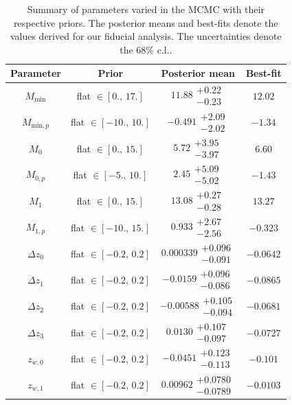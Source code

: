 \documentclass[a4paper,11pt]{article}
\newcommand\Tstrut{\rule{0pt}{3ex}}
\begin{document}
    \begin{table}
      \caption{Summary of parameters varied in the MCMC with their respective priors. The posterior means and best-fits denote the values derived for our fiducial analysis. The uncertainties denote the $68 \%$ c.l..} \label{tab:params}
      \begin{center}
        \begin{tabular}{cccc}
          \hline\hline 
          Parameter & Prior & Posterior mean & Best-fit \\ \hline \Tstrut                             
          $M_{\mathrm{min}}$ & flat $\in [0., \,17.]$ & $11.88\substack{+0.22 \\ -0.23}$ & $12.02$ \\ 
          $M_{\mathrm{min}, p}$ & flat $\in [-10., \,10.]$ & $-0.491\substack{+2.09 \\ -2.02}$ & $-1.34$ \\
          $M_{0}$ & flat $\in [0., \,15.]$ & $5.72\substack{+3.95 \\ -3.97}$ & $6.60$ \\
          $M_{0, p}$ & flat $\in [-5., \,10.]$ & $2.45\substack{+5.09 \\ -5.02}$ & $-1.43$ \\
          $M_{1}$ & flat $\in [0., \,15.]$ & $13.08\substack{+0.27 \\ -0.28}$ & $13.27$ \\ 
          $M_{1, p}$ & flat $\in [-10., \,15.]$ & $0.933\substack{+2.67 \\ -2.56}$ & $-0.323$ \\
          $\Delta z_{0}$ & flat $\in [-0.2, \,0.2]$ & $0.000339\substack{+0.096 \\ -0.091}$ & $-0.0642$ \\
          $\Delta z_{1}$ & flat $\in [-0.2, \,0.2]$ & $-0.0159\substack{+0.096 \\ -0.086}$ & $-0.0865$ \\
          $\Delta z_{2}$ & flat $\in [-0.2, \,0.2]$ & $-0.00588\substack{+0.105 \\ -0.094}$ & $-0.0681$ \\
          $\Delta z_{3}$ & flat $\in [-0.2, \,0.2]$ & $0.0130\substack{+0.107 \\ -0.097}$ & $-0.0727$ \\
          $z_{w, 0}$ & flat $\in [-0.2, \,0.2]$ & $-0.0451\substack{+0.123 \\ -0.113}$ & $-0.101$ \\
          $z_{w, 1}$ & flat $\in [-0.2, \,0.2]$ & $0.00962\substack{+0.0780 \\ -0.0789}$ & $-0.0103$ \\

\end{tabular}
\end{center}
\end{table}
\end{document}
